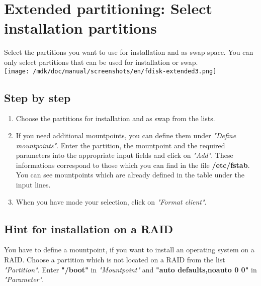 \section{Extended partitioning: Select installation partitions}Select the partitions you want to use for installation and as swap space. You can only select partitions that can be used for installation or swap.\\
\texttt{[image: /mdk/doc/manual/screenshots/en/fdisk-extended3.png]} \\
\subsection{Step by step}
\begin{enumerate}
\item Choose the partitions for installation and as swap from the lists.\\
\item If you need additional mountpoints, you can define them under \textit{"Define mountpoints"}. Enter the partition, the mountpoint and the required parameters into the appropriate input fields and click on \textit{"Add"}. These informations correspond to those which you can find in the file \textbf{/etc/fstab}. You can see mountpoints which are already defined in the table under the input lines.\\
\item When you have made your selection, click on \textit{"Format client"}.\\
\end{enumerate}
\subsection{Hint for installation on a RAID}
You have to define a mountpoint, if you want to install an operating system on a RAID. Choose a partition which is not located on a RAID from the list \textit{"Partition"}. Enter \textbf{"/boot"} in \textit{"Mountpoint"} and \textbf{"auto defaults,noauto 0 0"} in \textit{"Parameter"}.\\
